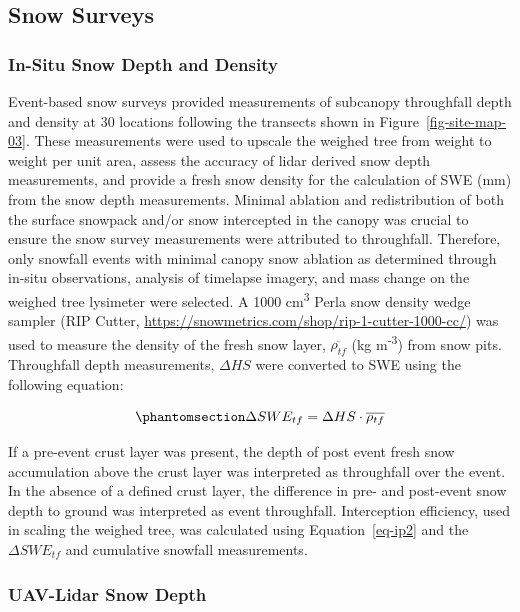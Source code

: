 \documentclass[
  letterpaper,
]{tex/uofsthesis-cs}
\begin{document}
\subsection{Snow Surveys}\label{snow-surveys}

\subsubsection{In-Situ Snow Depth and
Density}\label{in-situ-snow-depth-and-density}

Event-based snow surveys provided measurements of subcanopy throughfall
depth and density at 30 locations following the transects shown in
Figure~\ref{fig-site-map-03}. These measurements were used to upscale
the weighed tree from weight to weight per unit area, assess the
accuracy of lidar derived snow depth measurements, and provide a fresh
snow density for the calculation of SWE (mm) from the snow depth
measurements. Minimal ablation and redistribution of both the surface
snowpack and/or snow intercepted in the canopy was crucial to ensure the
snow survey measurements were attributed to throughfall. Therefore, only
snowfall events with minimal canopy snow ablation as determined through
in-situ observations, analysis of timelapse imagery, and mass change on
the weighed tree lysimeter were selected. A 1000 cm\textsuperscript{3}
Perla snow density wedge sampler (RIP Cutter,
\url{https://snowmetrics.com/shop/rip-1-cutter-1000-cc/}) was used to
measure the density of the fresh snow layer, \(\overline{\rho_{tf}}\)
(kg m\textsuperscript{-3}) from snow pits. Throughfall depth
measurements, \(\Delta HS\) were converted to SWE using the following
equation:

\begin{equation}\phantomsection\label{eq-swe-tf}{
\Delta SWE_{tf} = \Delta HS \cdot \overline{\rho_{tf}}
}\end{equation}

If a pre-event crust layer was present, the depth of post event fresh
snow accumulation above the crust layer was interpreted as throughfall
over the event. In the absence of a defined crust layer, the difference
in pre- and post-event snow depth to ground was interpreted as event
throughfall. Interception efficiency, used in scaling the weighed tree,
was calculated using Equation~\ref{eq-ip2} and the \(\Delta SWE_{tf}\)
and cumulative snowfall measurements.

\subsubsection{UAV-Lidar Snow Depth}\label{uav-lidar-snow-depth}
\end{document}
